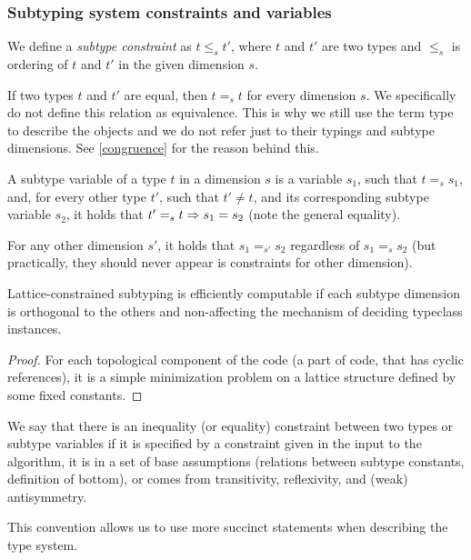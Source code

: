 \subsubsection{Subtyping system constraints and variables}

We define a \emph{subtype constraint} as $t \leq_s t'$, where $t$ and $t'$ are two types and $\leq_s$ is ordering of $t$ and $t'$ in the given dimension $s$.

If two types $t$ and $t'$ are equal, then $t =_s t$ for every dimension $s$. We specifically do not define this relation as equivalence. This is why we still use the term type to describe the objects and we do not refer just to their typings and subtype dimensions. See \cref{congruence} for the reason behind this.

\begin{defn}
    A subtype variable of a type $t$ in a dimension $s$  is a variable $s_1$, such that $t =_s s_1$, and, for every other type $t'$, such that $t' \neq t$, and its corresponding subtype variable $s_2$, it holds that $t' =_s t \Rightarrow s_1 = s_2$ (note the general equality).

    For any other dimension $s'$, it holds that $s_1 =_{s'} s_2$ regardless of $s_1 =_s s_2$ (but practically, they should never appear is constraints for other dimension).
\end{defn}

\begin{observe}
    Lattice-constrained subtyping is efficiently computable if each subtype dimension is orthogonal to the others and non-affecting the mechanism of deciding typeclass instances.

    \begin{proof}
        For each topological component of the code (a part of code, that has cyclic references), it is a simple minimization problem on a lattice structure defined by some fixed constants.
    \end{proof}
\end{observe}

\begin{conv}
    We say that there is an inequality (or equality) constraint between two types or subtype variables if it is specified by a constraint given in the input to the algorithm, it is in a set of base assumptions (relations between subtype constants, definition of bottom), or comes from transitivity, reflexivity, and (weak) antisymmetry.

    This convention allows us to use more succinct statements when describing the type system.
\end{conv}

